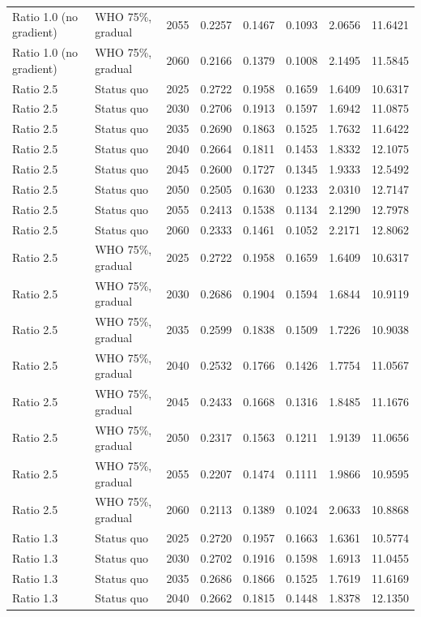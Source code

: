 \begin{longtable}{llrrrrrr}
Ratio 1.0 (no gradient) & WHO 75\%, gradual & 2055 & 0.2257 & 0.1467 & 0.1093 & 2.0656 & 11.6421 \\
Ratio 1.0 (no gradient) & WHO 75\%, gradual & 2060 & 0.2166 & 0.1379 & 0.1008 & 2.1495 & 11.5845 \\
Ratio 2.5 & Status quo & 2025 & 0.2722 & 0.1958 & 0.1659 & 1.6409 & 10.6317 \\
Ratio 2.5 & Status quo & 2030 & 0.2706 & 0.1913 & 0.1597 & 1.6942 & 11.0875 \\
Ratio 2.5 & Status quo & 2035 & 0.2690 & 0.1863 & 0.1525 & 1.7632 & 11.6422 \\
Ratio 2.5 & Status quo & 2040 & 0.2664 & 0.1811 & 0.1453 & 1.8332 & 12.1075 \\
Ratio 2.5 & Status quo & 2045 & 0.2600 & 0.1727 & 0.1345 & 1.9333 & 12.5492 \\
Ratio 2.5 & Status quo & 2050 & 0.2505 & 0.1630 & 0.1233 & 2.0310 & 12.7147 \\
Ratio 2.5 & Status quo & 2055 & 0.2413 & 0.1538 & 0.1134 & 2.1290 & 12.7978 \\
Ratio 2.5 & Status quo & 2060 & 0.2333 & 0.1461 & 0.1052 & 2.2171 & 12.8062 \\
Ratio 2.5 & WHO 75\%, gradual & 2025 & 0.2722 & 0.1958 & 0.1659 & 1.6409 & 10.6317 \\
Ratio 2.5 & WHO 75\%, gradual & 2030 & 0.2686 & 0.1904 & 0.1594 & 1.6844 & 10.9119 \\
Ratio 2.5 & WHO 75\%, gradual & 2035 & 0.2599 & 0.1838 & 0.1509 & 1.7226 & 10.9038 \\
Ratio 2.5 & WHO 75\%, gradual & 2040 & 0.2532 & 0.1766 & 0.1426 & 1.7754 & 11.0567 \\
Ratio 2.5 & WHO 75\%, gradual & 2045 & 0.2433 & 0.1668 & 0.1316 & 1.8485 & 11.1676 \\
Ratio 2.5 & WHO 75\%, gradual & 2050 & 0.2317 & 0.1563 & 0.1211 & 1.9139 & 11.0656 \\
Ratio 2.5 & WHO 75\%, gradual & 2055 & 0.2207 & 0.1474 & 0.1111 & 1.9866 & 10.9595 \\
Ratio 2.5 & WHO 75\%, gradual & 2060 & 0.2113 & 0.1389 & 0.1024 & 2.0633 & 10.8868 \\
Ratio 1.3 & Status quo & 2025 & 0.2720 & 0.1957 & 0.1663 & 1.6361 & 10.5774 \\
Ratio 1.3 & Status quo & 2030 & 0.2702 & 0.1916 & 0.1598 & 1.6913 & 11.0455 \\
Ratio 1.3 & Status quo & 2035 & 0.2686 & 0.1866 & 0.1525 & 1.7619 & 11.6169 \\
Ratio 1.3 & Status quo & 2040 & 0.2662 & 0.1815 & 0.1448 & 1.8378 & 12.1350 \\

\end{longtable}
